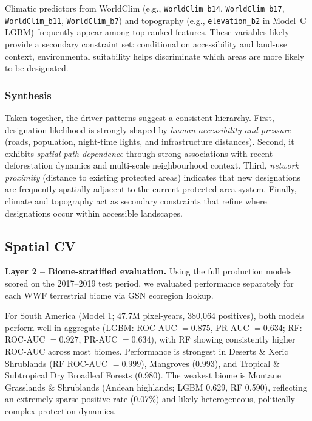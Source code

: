 \documentclass[12pt]{article}
\theoremstyle{break} %
\begin{document}
Climatic predictors from WorldClim (e.g., \texttt{WorldClim\_b14}, \texttt{WorldClim\_b17}, \texttt{WorldClim\_b11}, \texttt{WorldClim\_b7}) and topography (e.g., \texttt{elevation\_b2} in Model~C LGBM) frequently appear among top-ranked features. These variables likely provide a secondary constraint set: conditional on accessibility and land-use context, environmental suitability helps discriminate which areas are more likely to be designated.

\subsubsection*{Synthesis}

Taken together, the driver patterns suggest a consistent hierarchy. First, designation likelihood is strongly shaped by \emph{human accessibility and pressure} (roads, population, night-time lights, and infrastructure distances). Second, it exhibits \emph{spatial path dependence} through strong associations with recent deforestation dynamics and multi-scale neighbourhood context. Third, \emph{network proximity} (distance to existing protected areas) indicates that new designations are frequently spatially adjacent to the current protected-area system. Finally, climate and topography act as secondary constraints that refine where designations occur within accessible landscapes.

\subsection{Spatial CV}
\label{spatialcv}

\noindent \textbf{Layer 2 -- Biome-stratified evaluation.} Using the full production models scored on the 2017--2019 test period, we evaluated performance separately for each WWF terrestrial biome via GSN ecoregion lookup.

\medskip

\noindent For South America (Model 1; 47.7M pixel-years, 380,064 positives), both models perform well in aggregate (LGBM: ROC-AUC $= 0.875$, PR-AUC $= 0.634$; RF: ROC-AUC $= 0.927$, PR-AUC $= 0.634$), with RF showing consistently higher ROC-AUC across most biomes. Performance is strongest in Deserts \& Xeric Shrublands (RF ROC-AUC $= 0.999$), Mangroves (0.993), and Tropical \& Subtropical Dry Broadleaf Forests (0.980). The weakest biome is Montane Grasslands \& Shrublands (Andean highlands; LGBM 0.629, RF 0.590), reflecting an extremely sparse positive rate (0.07\%) and likely heterogeneous, politically complex protection dynamics.
\end{document}
